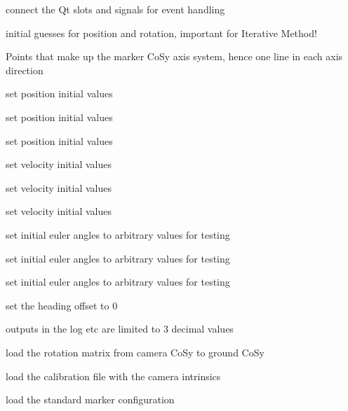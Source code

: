 connect the Qt slots and signals for event handling

initial guesses for position and rotation, important for Iterative Method!

Points that make up the marker Co\+Sy axis system, hence one line in each axis direction

set position initial values

set position initial values

set position initial values

set velocity initial values

set velocity initial values

set velocity initial values

set initial euler angles to arbitrary values for testing

set initial euler angles to arbitrary values for testing

set initial euler angles to arbitrary values for testing

set the heading offset to 0

outputs in the log etc are limited to 3 decimal values

load the rotation matrix from camera Co\+Sy to ground Co\+Sy

load the calibration file with the camera intrinsics

load the standard marker configuration

